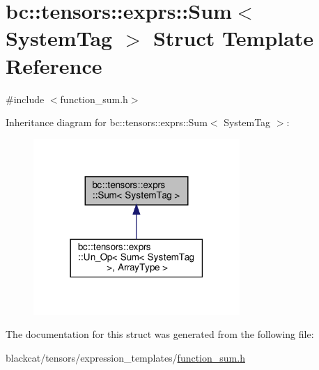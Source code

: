 \hypertarget{structbc_1_1tensors_1_1exprs_1_1Sum}{}\section{bc\+:\+:tensors\+:\+:exprs\+:\+:Sum$<$ System\+Tag $>$ Struct Template Reference}
\label{structbc_1_1tensors_1_1exprs_1_1Sum}


{\ttfamily \#include $<$function\+\_\+sum.\+h$>$}



Inheritance diagram for bc\+:\+:tensors\+:\+:exprs\+:\+:Sum$<$ System\+Tag $>$\+:\nopagebreak
\begin{figure}[H]
\begin{center}
\leavevmode
\includegraphics[width=222pt]{structbc_1_1tensors_1_1exprs_1_1Sum__inherit__graph}
\end{center}
\end{figure}


The documentation for this struct was generated from the following file\+:\begin{DoxyCompactItemize}
\item 
blackcat/tensors/expression\+\_\+templates/\hyperlink{function__sum_8h}{function\+\_\+sum.\+h}\end{DoxyCompactItemize}
